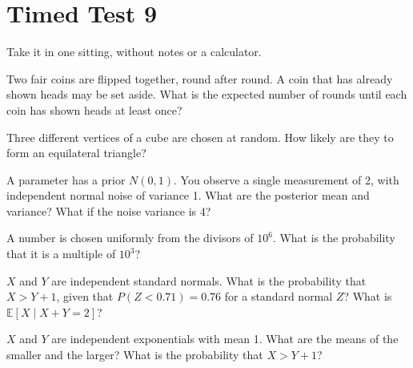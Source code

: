 \chapter{Timed Test 9}\label{ch:iv1:timed-test-9}

\begin{ivtrains}
Take it in one sitting, without notes or a calculator.
\end{ivtrains}


\begin{question}\label{iq:iv1:timed-test-9:1}
Two fair coins are flipped together, round after round. A coin that has already shown heads may be set aside. What is the expected number of rounds until each coin has shown heads at least once?
\end{question}

\begin{question}\label{iq:iv1:timed-test-9:2}
Three different vertices of a cube are chosen at random. How likely are they to form an equilateral triangle?
\end{question}

\begin{question}\label{iq:iv1:timed-test-9:3}
A parameter has a prior $N(0, 1)$. You observe a single measurement of 2, with independent normal noise of variance 1. What are the posterior mean and variance? What if the noise variance is 4?
\end{question}

\begin{question}\label{iq:iv1:timed-test-9:4}
A number is chosen uniformly from the divisors of $10^6$. What is the probability that it is a multiple of $10^3$?
\end{question}

\begin{question}\label{iq:iv1:timed-test-9:5}
$X$ and $Y$ are independent standard normals. What is the probability that $X > Y + 1$, given that $P(Z < 0.71) = 0.76$ for a standard normal $Z$? What is $\mathbb{E}[X \mid X + Y = 2]$?
\end{question}

\begin{question}\label{iq:iv1:timed-test-9:6}
$X$ and $Y$ are independent exponentials with mean 1. What are the means of the smaller and the larger? What is the probability that $X > Y + 1$?
\end{question}


